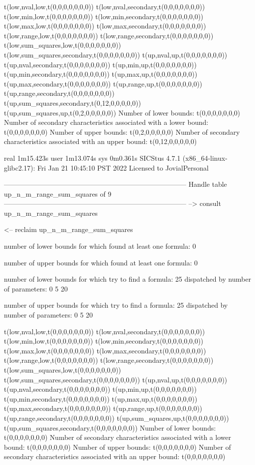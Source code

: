 t(low,nval,low,t(0,0,0,0,0,0,0))
t(low,nval,secondary,t(0,0,0,0,0,0,0))
t(low,min,low,t(0,0,0,0,0,0,0))
t(low,min,secondary,t(0,0,0,0,0,0,0))
t(low,max,low,t(0,0,0,0,0,0,0))
t(low,max,secondary,t(0,0,0,0,0,0,0))
t(low,range,low,t(0,0,0,0,0,0,0))
t(low,range,secondary,t(0,0,0,0,0,0,0))
t(low,sum_squares,low,t(0,0,0,0,0,0,0))
t(low,sum_squares,secondary,t(0,0,0,0,0,0,0))
t(up,nval,up,t(0,0,0,0,0,0,0))
t(up,nval,secondary,t(0,0,0,0,0,0,0))
t(up,min,up,t(0,0,0,0,0,0,0))
t(up,min,secondary,t(0,0,0,0,0,0,0))
t(up,max,up,t(0,0,0,0,0,0,0))
t(up,max,secondary,t(0,0,0,0,0,0,0))
t(up,range,up,t(0,0,0,0,0,0,0))
t(up,range,secondary,t(0,0,0,0,0,0,0))
t(up,sum_squares,secondary,t(0,12,0,0,0,0,0))
t(up,sum_squares,up,t(0,2,0,0,0,0,0))
Number of lower bounds:                                             t(0,0,0,0,0,0,0)
Number of secondary characteristics associated with a lower bound:  t(0,0,0,0,0,0,0)
Number of upper bounds:                                             t(0,2,0,0,0,0,0)
Number of secondary characteristics associated with an upper bound: t(0,12,0,0,0,0,0)

real	1m15.423s
user	1m13.074s
sys	0m0.361s
SICStus 4.7.1 (x86_64-linux-glibc2.17): Fri Jan 21 10:45:10 PST 2022
Licensed to JovialPersonal


--------------------------------------------------------------------------------
Handle table up_n_m_range_sum_squares of 9
--------------------------------------------------------------------------------
--> consult up_n_m_range_sum_squares

<-- reclaim up_n_m_range_sum_squares

number of lower bounds for which found at least one formula: 0

number of upper bounds for which found at least one formula: 0

number of lower bounds for which try to find a formula: 25
dispatched by number of parameters: 0  5  20

number of upper bounds for which try to find a formula: 25
dispatched by number of parameters: 0  5  20

t(low,nval,low,t(0,0,0,0,0,0,0))
t(low,nval,secondary,t(0,0,0,0,0,0,0))
t(low,min,low,t(0,0,0,0,0,0,0))
t(low,min,secondary,t(0,0,0,0,0,0,0))
t(low,max,low,t(0,0,0,0,0,0,0))
t(low,max,secondary,t(0,0,0,0,0,0,0))
t(low,range,low,t(0,0,0,0,0,0,0))
t(low,range,secondary,t(0,0,0,0,0,0,0))
t(low,sum_squares,low,t(0,0,0,0,0,0,0))
t(low,sum_squares,secondary,t(0,0,0,0,0,0,0))
t(up,nval,up,t(0,0,0,0,0,0,0))
t(up,nval,secondary,t(0,0,0,0,0,0,0))
t(up,min,up,t(0,0,0,0,0,0,0))
t(up,min,secondary,t(0,0,0,0,0,0,0))
t(up,max,up,t(0,0,0,0,0,0,0))
t(up,max,secondary,t(0,0,0,0,0,0,0))
t(up,range,up,t(0,0,0,0,0,0,0))
t(up,range,secondary,t(0,0,0,0,0,0,0))
t(up,sum_squares,up,t(0,0,0,0,0,0,0))
t(up,sum_squares,secondary,t(0,0,0,0,0,0,0))
Number of lower bounds:                                             t(0,0,0,0,0,0,0)
Number of secondary characteristics associated with a lower bound:  t(0,0,0,0,0,0,0)
Number of upper bounds:                                             t(0,0,0,0,0,0,0)
Number of secondary characteristics associated with an upper bound: t(0,0,0,0,0,0,0)

